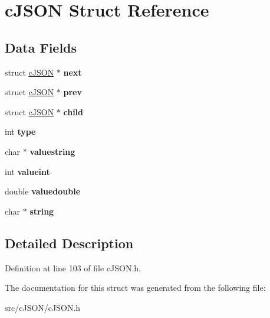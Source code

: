 \hypertarget{structc_j_s_o_n}{}\section{c\+J\+S\+ON Struct Reference}
\label{structc_j_s_o_n}
\subsection*{Data Fields}
\begin{DoxyCompactItemize}
\item 
\mbox{\label{structc_j_s_o_n_ade862b880379b5e2a591f7326401fa8d}} 
struct \hyperlink{structc_j_s_o_n}{c\+J\+S\+ON} $\ast$ {\bfseries next}
\item 
\mbox{\label{structc_j_s_o_n_a488a393f610347821fce8e985e79fc2f}} 
struct \hyperlink{structc_j_s_o_n}{c\+J\+S\+ON} $\ast$ {\bfseries prev}
\item 
\mbox{\label{structc_j_s_o_n_a401b274c2da358dac5c23ab8b2c71f85}} 
struct \hyperlink{structc_j_s_o_n}{c\+J\+S\+ON} $\ast$ {\bfseries child}
\item 
\mbox{\label{structc_j_s_o_n_ab13084c574681593b12f6e0a3db0dcfc}} 
int {\bfseries type}
\item 
\mbox{\label{structc_j_s_o_n_ad43f8de2571e504c4c5ce0a36990e6e1}} 
char $\ast$ {\bfseries valuestring}
\item 
\mbox{\label{structc_j_s_o_n_a369cea49494eb5d4409d532a731a0fbf}} 
int {\bfseries valueint}
\item 
\mbox{\label{structc_j_s_o_n_a4b21817d0fd2919901abadac73214e7f}} 
double {\bfseries valuedouble}
\item 
\mbox{\label{structc_j_s_o_n_aa6b47e9a4b0e0a26f519b1a2b6739983}} 
char $\ast$ {\bfseries string}
\end{DoxyCompactItemize}


\subsection{Detailed Description}


Definition at line 103 of file c\+J\+S\+O\+N.\+h.



The documentation for this struct was generated from the following file\+:\begin{DoxyCompactItemize}
\item 
src/c\+J\+S\+O\+N/c\+J\+S\+O\+N.\+h\end{DoxyCompactItemize}
